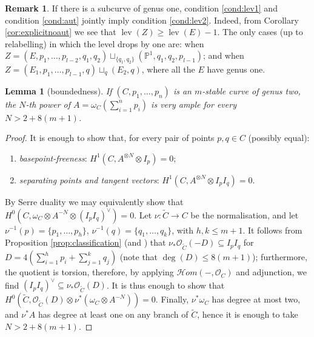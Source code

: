 \documentclass[11pt]{amsart}
\newcommand{\PP}{\mathbb P}
\newcommand{\OO}{\mathcal O}
\renewcommand{\to}{\rightarrow}
\newcommand{\hhom}{\mathcal{H}\!om}
\newcommand{\lev}{\operatorname{lev}}
\theoremstyle{plain}
\newtheorem{lem}[thm]{Lemma}
\theoremstyle{definition}
\newtheorem{rem}[thm]{Remark}
\begin{document}
\begin{rem}\label{rmk:lev1solev2}
 If there is a subcurve of genus one, condition \eqref{cond:lev1} and condition \eqref{cond:aut} jointly imply condition \eqref{cond:lev2}. Indeed, from Corollary \ref{cor:explicitnoaut} we see that $\lev(Z)\geq\lev(E)-1$. The only cases (up to relabelling) in which the level drops by one are: when $Z=(E,p_1,\ldots,p_{l-2},q_1,q_2)\sqcup_{\{q_1,q_2\}}(\PP^1,q_1,q_2,p_{l-1})$; and when $Z=(E_1,p_1,\ldots,p_{l-1},q)\sqcup_q(E_2,q)$, where all the $E$ have genus one.
\end{rem}


\begin{lem}[boundedness]
 If $(C,p_1,\ldots,p_n)$ is an $m$-stable curve of genus two, the $N$-th power of $A=\omega_C(\sum_{i=1}^np_i)$ is very ample for every $N>2+8(m+1)$.
\end{lem}
\begin{proof}
 It is enough to show that, for every pair of points $p,q\in C$ (possibly equal):
 \begin{enumerate}
  \item \emph{basepoint-freeness}: $H^1(C,A^{\otimes N}\otimes I_p)=0$;
  \item \emph{separating points and tangent vectors}: $H^1(C,A^{\otimes N}\otimes I_pI_q)=0$.
 \end{enumerate}
By Serre duality we may equivalently show that $H^0(C,\omega_C\otimes A^{-N}\otimes(I_pI_q)^\vee)=0$. Let $\nu\colon\tilde C\to C$ be the normalisation, and let $\nu^{-1}(p)=\{p_1,\ldots,p_h\}$, $\nu^{-1}(q)=\{q_1,\ldots,q_k\}$, with $h,k\leq m+1$. It follows from Proposition \ref{prop:classification} (and \cite[Proposition A.3]{SMY1}) that $\nu_*\OO_{\tilde C}(-D)\subseteq I_pI_q$ for $D=4(\sum_{i=1}^hp_i+\sum_{j=1}^kq_j)$ (note that $\deg(D)\leq 8(m+1)$); furthermore, the quotient is torsion, therefore, by applying $\hhom(-,\OO_C)$ and adjunction, we find $(I_pI_q)^\vee\subseteq\nu_*\OO_{\tilde C}(D)$. It is thus enough to show that $H^0(\tilde C,\OO_{\tilde C}(D)\otimes\nu^*(\omega_C\otimes A^{-N}))=0$. Finally, $\nu^*\omega_C$ has degree at most two, and $\nu^*A$ has degree at least one on any branch of $\tilde C$, hence it is enough to take $N>2+8(m+1)$.
\end{proof}
\end{document}
